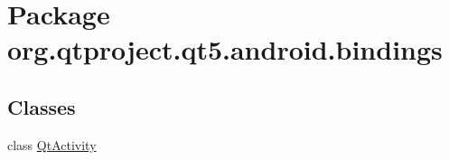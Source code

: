 \hypertarget{namespaceorg_1_1qtproject_1_1qt5_1_1android_1_1bindings}{}\section{Package org.\+qtproject.\+qt5.\+android.\+bindings}
\label{namespaceorg_1_1qtproject_1_1qt5_1_1android_1_1bindings}
\subsection*{Classes}
\begin{DoxyCompactItemize}
\item 
class \hyperlink{classorg_1_1qtproject_1_1qt5_1_1android_1_1bindings_1_1_qt_activity}{Qt\+Activity}
\end{DoxyCompactItemize}
